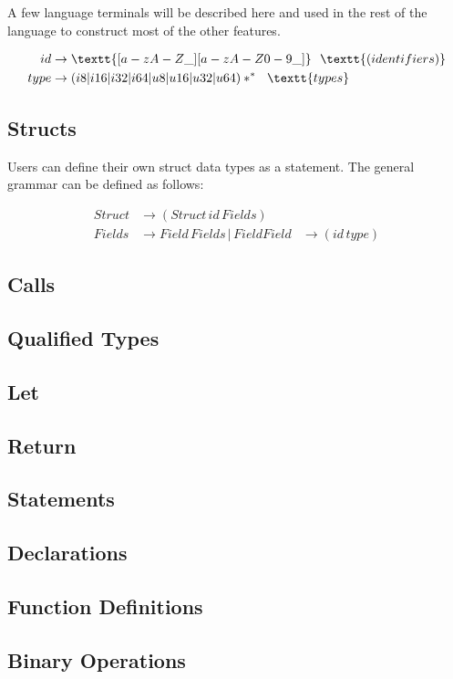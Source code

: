 \documentclass[journal=jacsat, manuscript=article]{achemso}
\begin{document}
A few language terminals will be described here and used in the rest of the
language to construct most of the other features.

\begin{align}
    id &\rightarrow \textt{[a-zA-Z\_][a-zA-Z0-9\_]}\,\,\,\,\textt{(identifiers)}\\
    type &\rightarrow (i8|i16|i32|i64|u8|u16|u32|u64)*^*\,\,\,\,\textt{types} \\
\end{align}

\subsection{Structs}

Users can define their own struct data types as a statement. The general
grammar can be defined as follows:

\begin{align}
Struct &\rightarrow (Struct\,id\,Fields) \\
Fields &\rightarrow Field\,Fields\,|\,Field
Field  &\rightarrow (id\,type)
\end{align}

\subsection{Calls}
\subsection{Qualified Types}
\subsection{Let}
\subsection{Return}
\subsection{Statements}
\subsection{Declarations}
\subsection{Function Definitions}
\subsection{Binary Operations}
\end{document}
